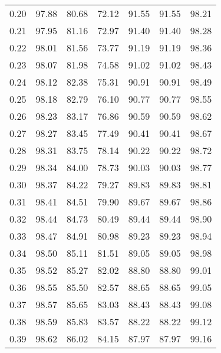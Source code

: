 \begin{tabular}{|c|c|c|c|c|c|c|}
      0.20 &     97.88 &     80.68 &      72.12 &   91.55 &      91.55 &         98.21 \\
      0.21 &     97.95 &     81.16 &      72.97 &   91.40 &      91.40 &         98.28 \\
      0.22 &     98.01 &     81.56 &      73.77 &   91.19 &      91.19 &         98.36 \\
      0.23 &     98.07 &     81.98 &      74.58 &   91.02 &      91.02 &         98.43 \\
      0.24 &     98.12 &     82.38 &      75.31 &   90.91 &      90.91 &         98.49 \\
      0.25 &     98.18 &     82.79 &      76.10 &   90.77 &      90.77 &         98.55 \\
      0.26 &     98.23 &     83.17 &      76.86 &   90.59 &      90.59 &         98.62 \\
      0.27 &     98.27 &     83.45 &      77.49 &   90.41 &      90.41 &         98.67 \\
      0.28 &     98.31 &     83.75 &      78.14 &   90.22 &      90.22 &         98.72 \\
      0.29 &     98.34 &     84.00 &      78.73 &   90.03 &      90.03 &         98.77 \\
      0.30 &     98.37 &     84.22 &      79.27 &   89.83 &      89.83 &         98.81 \\
      0.31 &     98.41 &     84.51 &      79.90 &   89.67 &      89.67 &         98.86 \\
      0.32 &     98.44 &     84.73 &      80.49 &   89.44 &      89.44 &         98.90 \\
      0.33 &     98.47 &     84.91 &      80.98 &   89.23 &      89.23 &         98.94 \\
      0.34 &     98.50 &     85.11 &      81.51 &   89.05 &      89.05 &         98.98 \\
      0.35 &     98.52 &     85.27 &      82.02 &   88.80 &      88.80 &         99.01 \\
      0.36 &     98.55 &     85.50 &      82.57 &   88.65 &      88.65 &         99.05 \\
      0.37 &     98.57 &     85.65 &      83.03 &   88.43 &      88.43 &         99.08 \\
      0.38 &     98.59 &     85.83 &      83.57 &   88.22 &      88.22 &         99.12 \\
      0.39 &     98.62 &     86.02 &      84.15 &   87.97 &      87.97 &         99.16 \\

\end{tabular}
